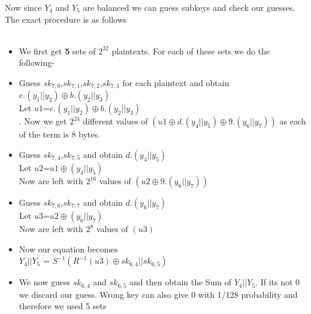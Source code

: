 \documentclass[preprint]{transcrypto}
\begin{document}
Now since $Y_{4}$ and $Y_{5}$ are balanced we can guess subkeys and check our guesses. \\ The exact procedure is as follows \\ \\
\begin{itemize}
	\item We first get \textbf{5} sets of $2^32$ plaintexts. For each of these sets we do the following-
	\item Guess $sk_{7,0}$,$sk_{7,1}$,$sk_{7,2}$,$sk_{7,3}$ for each plaintext and obtain $e.(y_{1}||y_{2})\oplus b.(y_{2}||y_{3})$\\
	Let $u1$=$e.(y_{1}||y_{2})\oplus b.(y_{2}||y_{3})$ \\.
	Now we get $2^{24}$ different values of $(u1\oplus d.(y_{4}||y_{5})\oplus9.(y_{6}|| y_{7}))$ as each of the term is 8 bytes.
	
	\item Guess $sk_{7,4}$,$sk_{7,5}$ and obtain 
	$d.(y_{4}||y_{5})$\\
	Let $u2$=$u1 \oplus (y_{4}||y_{5})$  \\  
	Now are left with $2^{16}$ values of $(u2\oplus9.(y_{6}|| y_{7}))$ \\
	\item Guess $sk_{7,6}$,$sk_{7,7}$ and obtain 
	$d.(y_{6}||y_{7})$\\
	Let $u3$=$u2 \oplus (y_{6}||y_{7})$  \\  
	Now are left with $2^8$ values of $(u3)$ \\
	 \item Now our equation becomes \\
	 $Y_{4}||Y_{5}$ = $S^{-1}(R^{-1}(u3)
	 \oplus sk_{6,4} || sk_{6,5})$\\
	 \item We now guess $sk_{6,4}$ and $sk_{6,5}$ and then obtain the Sum of $Y_{4}||Y_{5}$. If its not 0 we discard our guess. Wrong key can also give 0  with 1/128 probability and therefore we used 5 sets
\end{itemize}

\printbibliography

\end{document}
